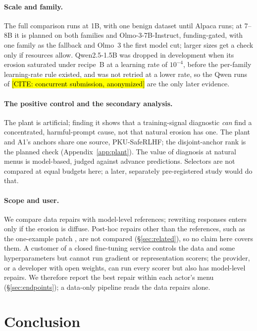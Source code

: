 \documentclass{article}
\theoremstyle{plain}
\theoremstyle{definition}
\theoremstyle{remark}
\newcommand{\ph}[1]{\hl{#1}}
\begin{document}
\paragraph{Scale and family.}
The full comparison runs at 1B, with one benign dataset until Alpaca runs; at
7--8B it is planned on both families and Olmo-3-7B-Instruct, funding-gated,
with one family as the fallback and Olmo~3 the first model cut; larger sizes
get a check only if resources allow. Qwen2.5-1.5B was dropped in development when its erosion saturated under recipe~B at a learning rate of
$10^{-4}$, before the per-family learning-rate rule existed, and was not retried at a lower rate, so the Qwen runs of
\ph{[CITE: concurrent submission, anonymized]} are the only later evidence.

\paragraph{The positive control and the secondary analysis.}
The plant is artificial; finding it shows that a training-signal diagnostic
\emph{can} find a concentrated, harmful-prompt cause, not that natural erosion has one. The plant and A1's anchors share one source, PKU-SafeRLHF; the disjoint-anchor rank is the planned check (Appendix~\ref{app:plant}).
The value of
diagnosis at natural menus is model-based, judged against advance predictions. Selectors are not compared at equal budgets here; a later, separately pre-registered study would do that.

\paragraph{Scope and user.}
We compare data repairs with model-level references; rewriting responses enters
only if the erosion is diffuse. Post-hoc repairs other than the references,
such as the one-example patch \citep{zhang2026oneshot}, are not compared
(\S\ref{sec:related}), so no claim here covers them. A customer of a closed fine-tuning service controls the data and
some hyperparameters but cannot run gradient or representation scorers; the
provider, or a developer with open weights, can run every scorer but also has
model-level repairs. We therefore report the best repair within each actor's
menu (\S\ref{sec:endpoints}); a data-only pipeline reads the data repairs
alone.

\section{Conclusion}
\label{sec:conclusion}
\end{document}
